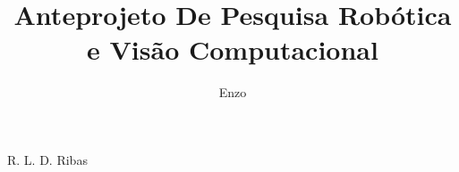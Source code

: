 \documentclass[bcl,numbers]{coppe}
\begin{document}
  \title{Anteprojeto De Pesquisa Robótica e Visão Computacional}
  \author{Enzo}{R. L. D. Ribas}



  \maketitle

  \small
  \tableofcontents
  

  \mainmatter

  
  
  
  
  
  
  



  \backmatter


  
\end{document}
